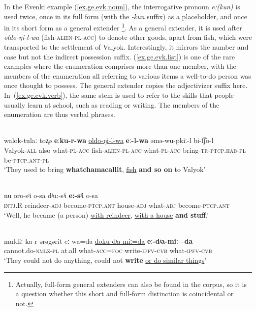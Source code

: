 \documentclass[output=paper,colorlinks,citecolor=brown
\ChapterDOI{10.5281/zenodo.15697577}
]{langscibook}
\begin{document}
In the Evenki example (\ref{ex.ge.evk.noun}), the interrogative pronoun \textit{e:(kun)} is used twice, once in its full form (with the \textit{-kun} suffix) as a placeholder, and once in its short form as a general extender \footnote{Actually, full-form general extenders can also be found in the corpus, so it is a question whether this short and full-form distinction is coincidental or not.}. As a general extender, it is used after \textit{oldo-ŋi-l-wa} (fish-\textsc{alien}-\textsc{pl}-\textsc{acc}) to denote other goods, apart from fish, which were transported to the settlement of Valyok. Interestingly, it mirrors the number and case but not the indirect possession suffix. (\ref{ex.ge.evk.list}) is one of the rare examples where the enumeration comprises more than one member, with the members of the enumeration all referring to various items a well-to-do person was once thought to possess. The general extender copies the adjectivizer suffix here. In~(\ref{ex.ge.evk.verb}), the same stem is used to refer to the skills that people usually learn at school, such as reading or writing. The members of the enumeration are thus verbal phrases.


 \ea \label{ex.ge.evk.noun}
 \\
\gll walok-tulaː toʐə \textbf{eːku-r-wa} \uline{oldo-ŋi-l-wa} \textbf{eː-l-wa} əmə-wu-pkiː-l bi-t͡ʃo-l\\
Valyok-\textsc{all} also what-\textsc{pl}-\textsc{acc} fish-\textsc{alien}-\textsc{pl}-\textsc{acc} what-\textsc{pl}-\textsc{acc} bring-\textsc{tr}-\textsc{ptcp.hab}-\textsc{pl} be-\textsc{ptcp.ant}-\textsc{pl}\\
\glt `They used to bring \textbf{whatchamacallit}, \uline{fish} \textbf{and so on} to Valyok' \\
 \z
{}


 \ea \label{ex.ge.evk.list}
 \\
\gll nu oro-sʲi o-sa dʲu:-sʲi \textbf{e:-sʲi} o-sa\\
\textsc{intj.R} reindeer-\textsc{adj} become-\textsc{ptcp.ant} house-\textsc{adj} what-\textsc{adj} become-\textsc{ptcp.ant}\\
\glt `Well, he became (a person) \uline{with reindeer}, \uline{with a house} \textbf{and stuff}.' \\
 \z
{}

 \ea \label{ex.ge.evk.verb}
 \\
\gll muldiː-ka-r ərəgərit eː-wa=da \uline{doku-dʲa-miː=da} \textbf{eː-dʲa-miː=da}\\
cannot.do-\textsc{nmlz}-\textsc{pl} at.all what-\textsc{acc}=\textsc{foc} write-\textsc{ipfv}-\textsc{cvb} what-\textsc{ipfv}-\textsc{cvb} \\
\glt `They could not do anything, could not \textbf{write} \uline{or do similar things}' \\
 \z
{}
\end{document}
